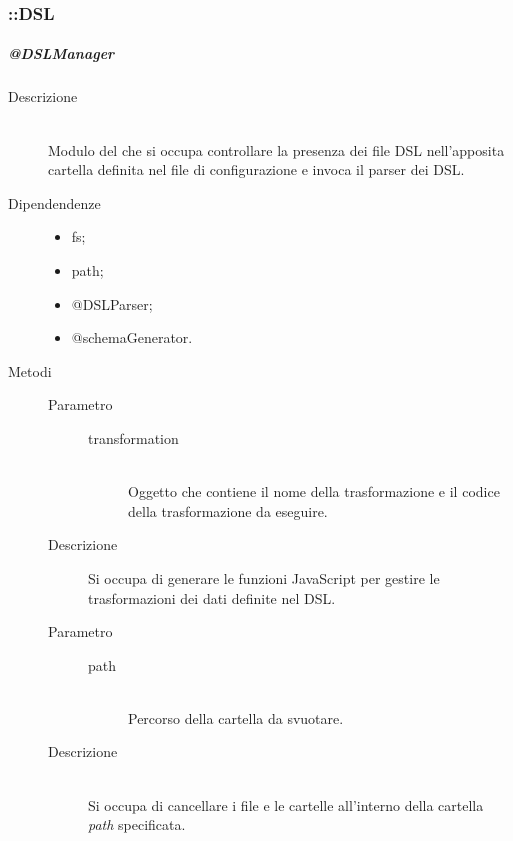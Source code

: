 \subsubsection{::DSL}
\subparagraph{@DSLManager}
\begin{description}
 \item[Descrizione] \hfill \\
  Modulo del  che si occupa controllare la presenza dei file DSL nell'apposita cartella definita nel file di configurazione e invoca il parser dei DSL.
 \item[Dipendendenze] \hfill 
 \begin{itemize}
 \item{fs};
  \item{path};
  \item{@DSLParser};
  \item{@schemaGenerator}.
 \end{itemize} 
 \item[Metodi]
 \begin{mldescription}
  \hfill 
  	\begin{description}
   		\item[Parametro] \hfill
   			\begin{description}
   				\item[transformation] \hfill \\
   				Oggetto che contiene il nome della trasformazione e il codice della trasformazione da eseguire.
   			\end{description}
   		\item[Descrizione]
   		Si occupa di generare le funzioni JavaScript per gestire le trasformazioni dei dati definite nel DSL.
   	\end{description}
  \hfill 
   	\begin{description}
    		\item[Parametro] \hfill
    			\begin{description}
    				\item[path] \hfill \\
    				Percorso della cartella da svuotare.
    			\end{description}
    		\item[Descrizione] \hfill \\
    		Si occupa di cancellare i file e le cartelle all'interno della cartella \textit{path} specificata.
    	\end{description}

\end{mldescription}
\end{description}
